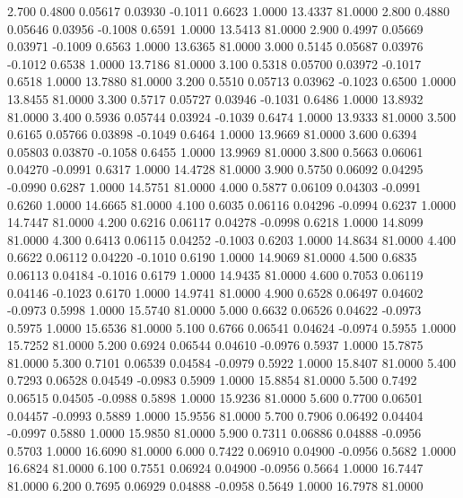    2.700   0.4800   0.05617   0.03930  -0.1011   0.6623   1.0000  13.4337  81.0000
   2.800   0.4880   0.05646   0.03956  -0.1008   0.6591   1.0000  13.5413  81.0000
   2.900   0.4997   0.05669   0.03971  -0.1009   0.6563   1.0000  13.6365  81.0000
   3.000   0.5145   0.05687   0.03976  -0.1012   0.6538   1.0000  13.7186  81.0000
   3.100   0.5318   0.05700   0.03972  -0.1017   0.6518   1.0000  13.7880  81.0000
   3.200   0.5510   0.05713   0.03962  -0.1023   0.6500   1.0000  13.8455  81.0000
   3.300   0.5717   0.05727   0.03946  -0.1031   0.6486   1.0000  13.8932  81.0000
   3.400   0.5936   0.05744   0.03924  -0.1039   0.6474   1.0000  13.9333  81.0000
   3.500   0.6165   0.05766   0.03898  -0.1049   0.6464   1.0000  13.9669  81.0000
   3.600   0.6394   0.05803   0.03870  -0.1058   0.6455   1.0000  13.9969  81.0000
   3.800   0.5663   0.06061   0.04270  -0.0991   0.6317   1.0000  14.4728  81.0000
   3.900   0.5750   0.06092   0.04295  -0.0990   0.6287   1.0000  14.5751  81.0000
   4.000   0.5877   0.06109   0.04303  -0.0991   0.6260   1.0000  14.6665  81.0000
   4.100   0.6035   0.06116   0.04296  -0.0994   0.6237   1.0000  14.7447  81.0000
   4.200   0.6216   0.06117   0.04278  -0.0998   0.6218   1.0000  14.8099  81.0000
   4.300   0.6413   0.06115   0.04252  -0.1003   0.6203   1.0000  14.8634  81.0000
   4.400   0.6622   0.06112   0.04220  -0.1010   0.6190   1.0000  14.9069  81.0000
   4.500   0.6835   0.06113   0.04184  -0.1016   0.6179   1.0000  14.9435  81.0000
   4.600   0.7053   0.06119   0.04146  -0.1023   0.6170   1.0000  14.9741  81.0000
   4.900   0.6528   0.06497   0.04602  -0.0973   0.5998   1.0000  15.5740  81.0000
   5.000   0.6632   0.06526   0.04622  -0.0973   0.5975   1.0000  15.6536  81.0000
   5.100   0.6766   0.06541   0.04624  -0.0974   0.5955   1.0000  15.7252  81.0000
   5.200   0.6924   0.06544   0.04610  -0.0976   0.5937   1.0000  15.7875  81.0000
   5.300   0.7101   0.06539   0.04584  -0.0979   0.5922   1.0000  15.8407  81.0000
   5.400   0.7293   0.06528   0.04549  -0.0983   0.5909   1.0000  15.8854  81.0000
   5.500   0.7492   0.06515   0.04505  -0.0988   0.5898   1.0000  15.9236  81.0000
   5.600   0.7700   0.06501   0.04457  -0.0993   0.5889   1.0000  15.9556  81.0000
   5.700   0.7906   0.06492   0.04404  -0.0997   0.5880   1.0000  15.9850  81.0000
   5.900   0.7311   0.06886   0.04888  -0.0956   0.5703   1.0000  16.6090  81.0000
   6.000   0.7422   0.06910   0.04900  -0.0956   0.5682   1.0000  16.6824  81.0000
   6.100   0.7551   0.06924   0.04900  -0.0956   0.5664   1.0000  16.7447  81.0000
   6.200   0.7695   0.06929   0.04888  -0.0958   0.5649   1.0000  16.7978  81.0000
